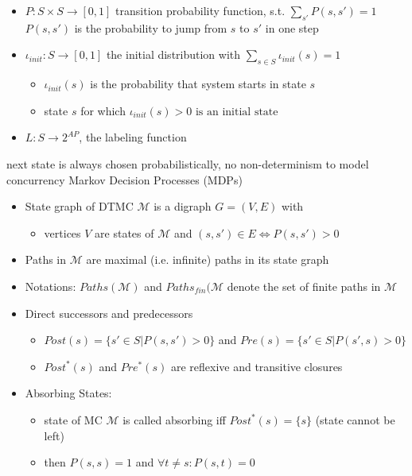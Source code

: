 \documentclass[a4paper, 10pt]{article}
\begin{document}
\begin{mdframed}
\begin{itemize}
    \item $P:S\times S\to[0,1]$ transition probability function, s.t. $\sum_{s'}P(s,s')=1$ \\
    $P(s,s')$ is the probability to jump from $s$ to $s'$ in one step
    \item $\iota_{init}:S\to[0,1]$ the initial distribution with $\sum_{s\in S}\iota_{init}(s)=1$
    \begin{itemize}
        \item $\iota_{init}(s)$ is the probability that system starts in state $s$
        \item state $s$ for which $\iota_{init}(s)>0 \text{ is an initial state}$
    \end{itemize}
    \item $L:S\to 2^{AP}$, the labeling function
\end{itemize}
next state is always chosen probabilistically, no non-determinism to model concurrency \follows Markov Decision Processes (MDPs)
\begin{itemize}
    \item State graph of DTMC $\mathcal{M}$ is a digraph $G=(V,E)$ with
    \begin{itemize}
        \item vertices $V$ are states of $\mathcal{M}$ and $(s,s')\in E \iff P(s,s')>0$
    \end{itemize}
    \item Paths in $\mathcal{M}$ are maximal (i.e. infinite) paths in its state graph
    \item Notations: $Paths(\mathcal{M})$ and $Paths_{fin}(\mathcal{M}$ denote the set of finite paths in $\mathcal{M}$
    \item Direct successors and predecessors
    \begin{itemize}
        \item $Post(s)=\{s'\in S|P(s,s')>0\}$ and $Pre(s)=\{s'\in S|P(s',s)>0\}$
        \item $Post^*(s)$ and $Pre^*(s)$ are reflexive and transitive closures
    \end{itemize}
    \item Absorbing States:
    \begin{itemize}
        \item state of MC $\mathcal{M}$ is called absorbing iff $Post^*(s)=\{s\}$ {\tiny (state cannot be left)}
        \item then $P(s,s)=1$ and $\forall t\not=s:P(s,t)=0$
    \end{itemize}

\end{itemize}
\end{mdframed}
\end{document}
